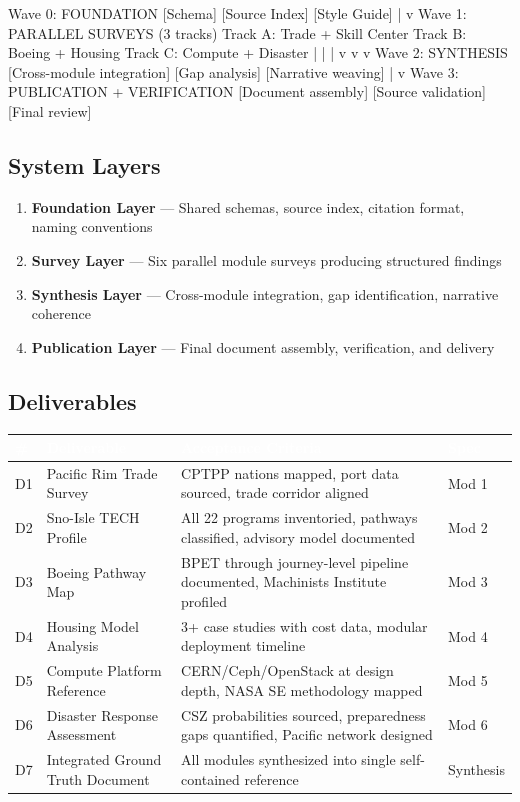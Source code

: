 \documentclass[11pt,letterpaper]{article}
\newcommand{\tableheader}[1]{\textbf{\sffamily\textcolor{white}{#1}}}
\begin{document}
\begin{asciibox}
 Wave 0: FOUNDATION
 [Schema] [Source Index] [Style Guide]
     |
     v
 Wave 1: PARALLEL SURVEYS (3 tracks)
 Track A: Trade + Skill Center    Track B: Boeing + Housing
 Track C: Compute + Disaster
     |              |              |
     v              v              v
 Wave 2: SYNTHESIS
 [Cross-module integration] [Gap analysis] [Narrative weaving]
     |
     v
 Wave 3: PUBLICATION + VERIFICATION
 [Document assembly] [Source validation] [Final review]
\end{asciibox}

\subsection{System Layers}

\begin{enumerate}[leftmargin=2em]
\item \textbf{Foundation Layer} --- Shared schemas, source index, citation format, naming conventions
\item \textbf{Survey Layer} --- Six parallel module surveys producing structured findings
\item \textbf{Synthesis Layer} --- Cross-module integration, gap identification, narrative coherence
\item \textbf{Publication Layer} --- Final document assembly, verification, and delivery
\end{enumerate}

\subsection{Deliverables}

\begin{center}
\begin{tabularx}{\textwidth}{C{0.6cm}L{3.5cm}XC{1.5cm}}
\toprule
{}
\tableheader{\#} & \tableheader{Deliverable} & \tableheader{Acceptance Criteria} & \tableheader{Spec} \\
\midrule
D1 & Pacific Rim Trade Survey & CPTPP nations mapped, port data sourced, trade corridor aligned & Mod 1 \\
D2 & Sno-Isle TECH Profile & All 22 programs inventoried, pathways classified, advisory model documented & Mod 2 \\
D3 & Boeing Pathway Map & BPET through journey-level pipeline documented, Machinists Institute profiled & Mod 3 \\
D4 & Housing Model Analysis & 3+ case studies with cost data, modular deployment timeline & Mod 4 \\
D5 & Compute Platform Reference & CERN/Ceph/OpenStack at design depth, NASA SE methodology mapped & Mod 5 \\
D6 & Disaster Response Assessment & CSZ probabilities sourced, preparedness gaps quantified, Pacific network designed & Mod 6 \\
D7 & Integrated Ground Truth Document & All modules synthesized into single self-contained reference & Synthesis \\
\bottomrule
\end{tabularx}
\end{center}
\end{document}
